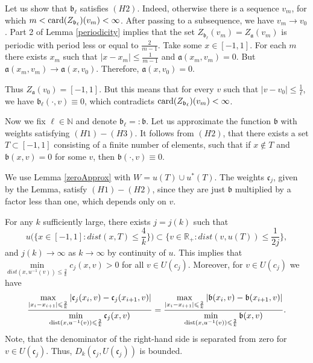 \documentclass[12pt]{article}
\newcommand{\Real}{\mathbb R}
\newcommand{\Nat}{\mathbb N}
\newcommand{\abs}[1]{\left\vert#1\right\vert}
\renewcommand{\le}{\leqslant}
\newcommand{\card}{{\rm card}}
\newcommand{\dist}{\mathop{\rm dist}\nolimits}
\begin{document}
Let us show that $\mathfrak b_{\ell}$ satisfies $(H2)$.
Indeed, otherwise there is a sequence $v_m$, for which
$m < \card(Z_{\mathfrak b_{\ell}})(v_m) < \infty$.
After passing to a subsequence, we have $v_m \to v_0$.
Part 2 of Lemma \ref{periodicity} implies that the set $Z_{\mathfrak b_{\ell}}(v_m) = Z_{\mathfrak a}(v_m)$
is periodic with period less or equal to $\frac{2}{m - 1}$.
Take some $x \in [-1, 1]$. For each $m$ there exists $x_m$ such that
$\abs{x - x_m} \le \frac{1}{m - 1}$ and $\mathfrak a(x_m, v_m) = 0$.
But $\mathfrak a(x_m, v_m) \to \mathfrak a(x, v_0)$.
Therefore, $\mathfrak a(x, v_0) = 0$.

Thus $Z_{\mathfrak a}(v_0) = [-1, 1]$.
But this means that for every $v$ such that $\abs{v - v_0} \le \frac{1}{\ell}$,
we have $\mathfrak b_{\ell}(\cdot, v) \equiv 0$,
which contradicts $\card(Z_{\mathfrak b_{\ell}})(v_m) < \infty$.

Now we fix $\ell \in \Nat$ and denote $\mathfrak b_{\ell} =: \mathfrak b$.
Let us approximate the function $\mathfrak b$ with weights satisfying $(H1)-(H3)$.
It follows from $(H2)$, that there exists a set $T \subset [-1, 1]$
consisting of a finite number of elements, such that
if $x \not\in T$ and $\mathfrak b(x, v) = 0$ for some $v$, then $\mathfrak b(\cdot, v) \equiv 0$.

We use Lemma \ref{zeroApprox} with $W = u(T) \cup u^*(T)$.
The weights $\mathfrak c_j$, given by the Lemma, satisfy $(H1)-(H2)$,
since they are just $\mathfrak b$ multiplied by a factor less than one, which depends only on $v$.

For any $k$ sufficiently large, there exists $j = j(k)$ such that
$$u\Big( \Big\{ x \in [-1, 1]: dist(x, T) \le \frac{4}{k} \Big\} \Big) \subset \Big\{ v \in \Real_+: dist(v, u(T)) \le \frac{1}{2j} \Big\},$$
and $j(k) \to \infty$ as $k \to \infty$ by continuity of $u$.
This implies that $\min\limits_{dist(x, u^{-1}(v)) \le \frac{2}{k}} c_j(x, v) > 0$
for all $v \in U(c_j)$.
Moreover, for $v \in U(c_j)$ we have
$$
\frac{\max\limits_{\abs{x_i - x_{i + 1}} \le \frac{2}{k}} \abs{\mathfrak c_j(x_i, v) - \mathfrak c_j(x_{i + 1}, v)}}
{\min\limits_{\dist(x, u^{-1}(v)) \le \frac{2}{k}} \mathfrak c_j(x, v)}
=\frac{\max\limits_{\abs{x_i - x_{i + 1}} \le \frac{2}{k}} \abs{\mathfrak b(x_i, v) - \mathfrak b(x_{i + 1}, v)}}
{\min\limits_{\dist(x, u^{-1}(v)) \le \frac{2}{k}} \mathfrak b(x, v)}.
$$
Note, that the denominator of the right-hand side is separated from zero for $v \in U(\mathfrak c_j)$.
Thus, $D_k(\mathfrak c_j, U(\mathfrak c_j))$ is bounded.
\end{document}
